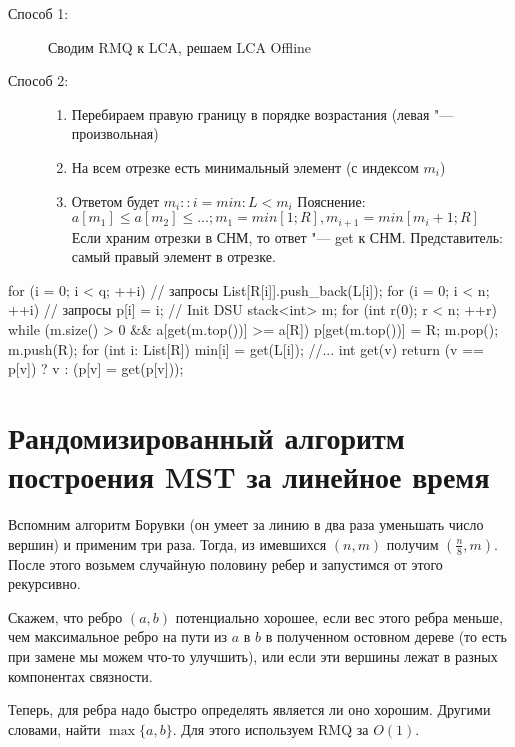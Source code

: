 \begin{description}
\item[Способ 1:]
	Сводим RMQ к LCA, решаем LCA Offline

\item[Способ 2:]
	\begin{enumerate}
	\item
		Перебираем правую границу в порядке возрастания (левая "--- произвольная)

	\item
		На всем отрезке есть минимальный элемент (с индексом $m_i$)

	\item
		Ответом будет $m_i\colon: i = min: L < m_i$
		Пояснение:   $a[m_1] \le a[m_2] \le ...; m_1 = 	{min}[1; R], m_{i+1} = 	{min}[m_i + 1; R]$
		Если храним отрезки в СНМ, то ответ "--- get к СНМ. Представитель: самый правый элемент в отрезке.
	\end{enumerate}
\end{description}

\begin{cppcode}
for (i = 0; i < q; ++i) // запросы
	List[R[i]].push_back(L[i]);
for (i = 0; i < n; ++i) // запросы
	p[i] = i; // Init DSU
stack<int> m;
for (int r(0); r < n; ++r)
	while (m.size() > 0 && a[get(m.top())] >= a[R])
		p[get(m.top())] = R;
		m.pop();
	m.push(R);
	for (int i: List[R])
		min[i] = get(L[i]);
//...
int get(v) {
	return (v == p[v]) ? v : (p[v] = get(p[v]));
}
\end{cppcode}

\section{Рандомизированный алгоритм построения MST за линейное время}

Вспомним алгоритм Борувки (он умеет за линию в два раза уменьшать число вершин) и применим три раза.
Тогда, из имевшихся $(n, m)$ получим $\left(\frac{n}{8}, m\right)$.
После этого возьмем случайную половину ребер и запустимся от этого рекурсивно.

Скажем, что ребро $(a, b)$ потенциально хорошее, если вес этого ребра меньше,
чем максимальное ребро на пути из $a$ в $b$ в полученном остовном дереве (то есть при замене мы можем что-то улучшить),
или если эти вершины лежат в разных компонентах связности.

Теперь, для ребра надо быстро определять является ли оно хорошим.
Другими словами, найти $\max\{a, b\}$. Для этого используем RMQ за $O(1)$.


